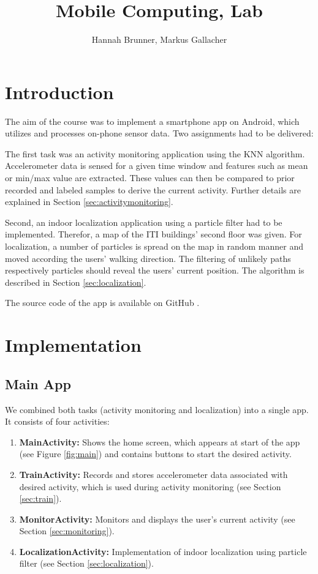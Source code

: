 \documentclass[12pt]{article}
\begin{document}
 
\title{Mobile Computing, Lab}
\author{Hannah Brunner, Markus Gallacher}

\maketitle


\section{Introduction}

The aim of the course was to implement a smartphone app on Android, which utilizes and processes on-phone sensor data. Two assignments had to be delivered:

The first task was an activity monitoring application using the KNN algorithm. Accelerometer data is sensed for a given time window and features such as mean or min/max value are extracted. These values can then be compared to prior recorded and labeled samples to derive the current activity. Further details are explained in Section \ref{sec:activitymonitoring}.

Second, an indoor localization application using a particle filter had to be implemented. Therefor, a map of the ITI buildings' second floor was given. For localization, a number of particles is spread on the map in random manner and moved according the users' walking direction. The filtering of unlikely paths respectively particles should reveal the users' current position. The algorithm is described in Section \ref{sec:localization}.

The source code of the app is available on GitHub \cite{repo}. 

\section{Implementation}
\subsection{Main App}
We combined both tasks (activity monitoring and localization) into a single app. It consists of four activities:
\begin{enumerate}
	\item \textbf{MainActivity:} Shows the home screen, which appears at start of the app (see Figure \ref{fig:main}) and contains buttons to start the desired activity.
	\item \textbf{TrainActivity:} Records and stores accelerometer data associated with desired activity, which is used during activity monitoring (see Section \ref{sec:train}).
	\item \textbf{MonitorActivity:} Monitors and displays the user's current activity (see Section \ref{sec:monitoring}).
	\item \textbf{LocalizationActivity:} Implementation of indoor localization using particle filter (see Section \ref{sec:localization}).
\end{enumerate}
\end{document}
